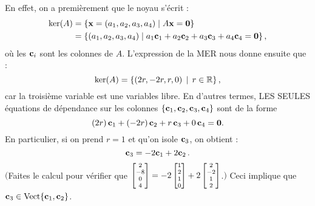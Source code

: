 \begin{myprob}
\begin{mysol}
En effet,  on a premièrement que le noyau s'écrit :
\begin{align*}
\ker(A) &= \{ \mathbf{x} = (a_1, a_2,a_3,a_4) \mid A\mathbf{x} = \mathbf{0}\}\\
 &= \{ (a_1, a_2, a_3, a_4) \mid a_1\mathbf{c}_1 + a_2\mathbf{c}_2 + a_3\mathbf{c}_3+a_4\mathbf{c}_4 = \mathbf{0} \}\,,
\end{align*}
où les $\mathbf{c}_i$ sont les colonnes de $A$. 
L'expression de la MER nous donne ensuite que :
$$
\ker(A) = \{ (2r,-2r,r,0)\, \mid \, r\in \mathbb{R}\}\,,
$$
car la troisième variable est une variables libre.
En d'autres termes, LES SEULES équations de dépendance sur les colonnes $\{\mathbf{c}_1, \mathbf{c}_2, \mathbf{c}_3, \mathbf{c}_4\}$ sont de la forme
\begin{equation} \label{eq: dernier exemple chap 16}
(2r)\,\mathbf{c}_1 + (-2r)\,\mathbf{c}_2 + r\,\mathbf{c}_3+0\,\mathbf{c}_4 = \mathbf{0}.
\end{equation}
En particulier, si on prend $r=1$ et qu'on isole $\mathbf{c}_3$, on obtient :
$$
\mathbf{c}_3 = -2\mathbf{c}_1 + 2\mathbf{c}_2\,.
$$
$\Bigg($Faites le calcul pour vérifier que  $\scriptsize\left[ \begin{matrix} 2\\-8\\0\\4 \end{matrix} \right] =-2 \left[ \begin{matrix} 1\\2\\1\\0 \end{matrix} \right] +2\left[ \begin{matrix} 2\\-2\\1\\2 \end{matrix} \right]$.$\Bigg)$ Ceci implique que $\mathbf{c}_3 \in \textrm{Vect}\{\mathbf{c}_1, \mathbf{c}_2\}$.


\end{mysol}
\end{myprob}
